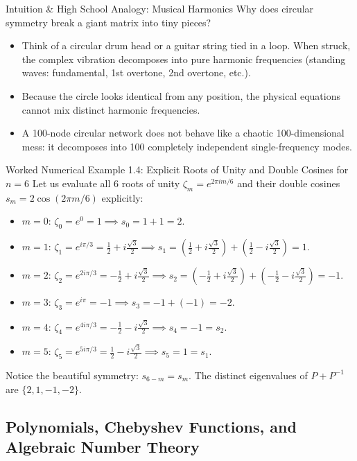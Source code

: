 \documentclass[11pt]{article}
\begin{document}
\begin{intubox}{Intuition \& High School Analogy: Musical Harmonics}
Why does circular symmetry break a giant matrix into tiny pieces?
\begin{itemize}[leftmargin=*,nosep]
  \item Think of a circular drum head or a guitar string tied in a loop. When struck, the complex vibration decomposes into pure harmonic frequencies (standing waves: fundamental, 1st overtone, 2nd overtone, etc.).
  \item Because the circle looks identical from any position, the physical equations cannot mix distinct harmonic frequencies.
  \item A 100-node circular network does not behave like a chaotic 100-dimensional mess: it decomposes into 100 completely independent single-frequency modes.
\end{itemize}
\end{intubox}

\begin{callbox}{Worked Numerical Example 1.4: Explicit Roots of Unity and Double Cosines for $n=6$}
Let us evaluate all 6 roots of unity $\zeta_m = e^{2\pi i m / 6}$ and their double cosines $s_m = 2\cos(2\pi m / 6)$ explicitly:
\begin{itemize}[leftmargin=*,nosep]
  \item $m=0$: $\zeta_0 = e^0 = 1 \implies s_0 = 1 + 1 = 2$.
  \item $m=1$: $\zeta_1 = e^{i\pi/3} = \frac{1}{2} + i\frac{\sqrt{3}}{2} \implies s_1 = \left(\frac{1}{2} + i\frac{\sqrt{3}}{2}\right) + \left(\frac{1}{2} - i\frac{\sqrt{3}}{2}\right) = 1$.
  \item $m=2$: $\zeta_2 = e^{2i\pi/3} = -\frac{1}{2} + i\frac{\sqrt{3}}{2} \implies s_2 = \left(-\frac{1}{2} + i\frac{\sqrt{3}}{2}\right) + \left(-\frac{1}{2} - i\frac{\sqrt{3}}{2}\right) = -1$.
  \item $m=3$: $\zeta_3 = e^{i\pi} = -1 \implies s_3 = -1 + (-1) = -2$.
  \item $m=4$: $\zeta_4 = e^{4i\pi/3} = -\frac{1}{2} - i\frac{\sqrt{3}}{2} \implies s_4 = -1 = s_2$.
  \item $m=5$: $\zeta_5 = e^{5i\pi/3} = \frac{1}{2} - i\frac{\sqrt{3}}{2} \implies s_5 = 1 = s_1$.
\end{itemize}
Notice the beautiful symmetry: $s_{6-m} = s_m$. The distinct eigenvalues of $P + P^{-1}$ are $\{2, 1, -1, -2\}$.
\end{callbox}

\subsection{Polynomials, Chebyshev Functions, and Algebraic Number Theory}
\end{document}

